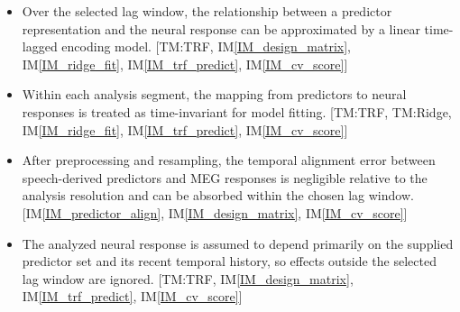 \documentclass[12pt]{article}
\newcounter{assumpnum} %
\begin{document}






\begin{itemize}
  \item[A1:] Over the selected lag window, the relationship between a predictor representation and the neural response can be approximated by a linear time-lagged encoding model. [TM:TRF, IM\ref{IM_design_matrix}, IM\ref{IM_ridge_fit}, IM\ref{IM_trf_predict}, IM\ref{IM_cv_score}]

  \item[A2:] Within each analysis segment, the mapping from predictors to neural responses is treated as time-invariant for model fitting. [TM:TRF, TM:Ridge, IM\ref{IM_ridge_fit}, IM\ref{IM_trf_predict}, IM\ref{IM_cv_score}]

  \item[A3:] After preprocessing and resampling, the temporal alignment error between speech-derived predictors and MEG responses is negligible relative to the analysis resolution and can be absorbed within the chosen lag window. [IM\ref{IM_predictor_align}, IM\ref{IM_design_matrix}, IM\ref{IM_cv_score}]

  \item[A4:] The analyzed neural response is assumed to depend primarily on the supplied predictor set and its recent temporal history, so effects outside the selected lag window are ignored. [TM:TRF, IM\ref{IM_design_matrix}, IM\ref{IM_trf_predict}, IM\ref{IM_cv_score}]
\end{itemize}
\end{document}

